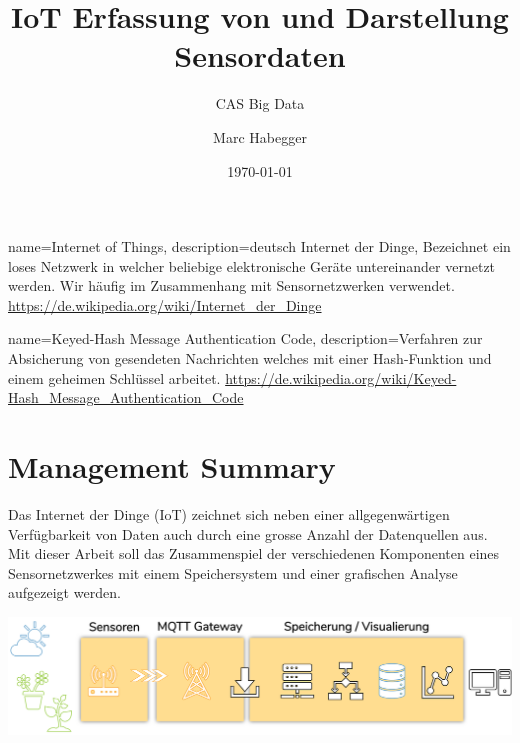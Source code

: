\documentclass[
  12pt, %
  a4paper, %
  twoside, %
  openany, %
  numbers=noenddot, %
  BCOR=5mm, %
  parskip=half*, %
  thesis, %
]{bfhbook}
\author{Marc Habegger}
\title{IoT Erfassung von und Darstellung Sensordaten}
\subtitle{CAS Big Data}
\date{\today} %
\begin{document}
 
{
    name=Internet of Things,
    description={deutsch Internet der Dinge, Bezeichnet ein loses Netzwerk in welcher beliebige elektronische Geräte untereinander vernetzt werden. Wir häufig im Zusammenhang mit Sensornetzwerken verwendet.\break 
    \url{https://de.wikipedia.org/wiki/Internet_der_Dinge}}
}

{
    name=Keyed-Hash Message Authentication Code,
    description={Verfahren zur Absicherung von gesendeten Nachrichten welches mit einer Hash-Funktion und einem geheimen Schlüssel arbeitet.\break
    \url{https://de.wikipedia.org/wiki/Keyed-Hash_Message_Authentication_Code}}
}

\maketitle
\frontmatter %

\tableofcontents
\sloppy
\mainmatter %
\chapter*{Management Summary}
Das Internet der Dinge (\Gls{IoT}) zeichnet sich neben einer allgegenwärtigen Verfügbarkeit von Daten auch durch eine grosse Anzahl der Datenquellen aus. Mit dieser Arbeit soll das Zusammenspiel der verschiedenen Komponenten eines Sensornetzwerkes mit einem Speichersystem und einer grafischen Analyse aufgezeigt werden.

  \begin{center}
    \includegraphics[width=18cm, left]{Bilder/Overview.png}
     \captionsetup{justification=centering}
  \end{center}
   
\end{document}
